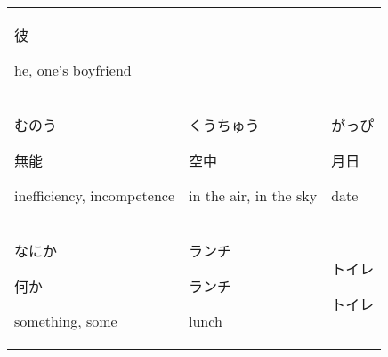 \documentclass[12pt, a4j, landscape, dvipdfmx]{utarticle}
\begin{document}
\begin{minipage}[t][0pt]{\linewidth }
\begin{tabular}{||p{5.5cm}||p{5.5cm}||p{5.5cm}||}
{            彼}\newline \rule{0pt}{3ex} \hspace*{.425cm}
            {\small he, one's boyfriend}\tabularnewline
            \hhline{|:=::=::=:|} \rule{0pt}{3ex}
            \hspace*{-.4cm} {\LARGE むのう}\newline
            \rule{0pt}{3ex} \hspace*{.4cm} {\small
            無能}\newline \rule{0pt}{3ex} \hspace*{.425cm}
            {\small
            inefficiency, incompetence}&\rule{0pt}{3ex}
            \hspace*{-.4cm} {\LARGE くうちゅう}\newline
            \rule{0pt}{3ex} \hspace*{.4cm} {\small
            空中}\newline \rule{0pt}{3ex} \hspace*{.425cm}
            {\small in the air, in the sky}&\rule{0pt}{3ex}
            \hspace*{-.4cm} {\LARGE がっぴ}\newline
            \rule{0pt}{3ex} \hspace*{.4cm} {\small
            月日}\newline \rule{0pt}{3ex} \hspace*{.425cm}
            {\small date}\tabularnewline
            \hhline{|:=::=::=:|} \rule{0pt}{3ex}
            \hspace*{-.4cm} {\LARGE なにか}\newline
            \rule{0pt}{3ex} \hspace*{.4cm} {\small
            何か}\newline \rule{0pt}{3ex} \hspace*{.425cm}
            {\small something, some}&\rule{0pt}{3ex}
            \hspace*{-.4cm} {\LARGE ランチ}\newline
            \rule{0pt}{3ex} \hspace*{.4cm} {\small
            ランチ}\newline \rule{0pt}{3ex} \hspace*{.425cm}
            {\small lunch}&\rule{0pt}{3ex} \hspace*{-.4cm}
            {\LARGE トイレ}\newline \rule{0pt}{3ex}
            \hspace*{.4cm} {\small トイレ}\newline

\end{tabular}
\end{minipage}
\end{document}
